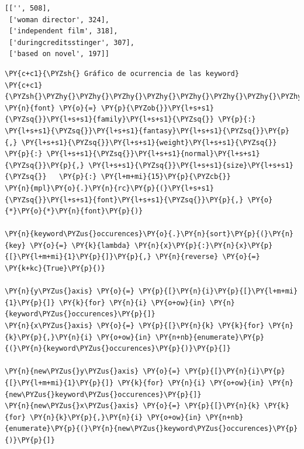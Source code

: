             \begin{tcolorbox}[breakable, boxrule=.5pt, size=fbox, pad at break*=1mm, opacityfill=0]
\begin{Verbatim}[commandchars=\\\{\}]
[['', 508],
 ['woman director', 324],
 ['independent film', 318],
 ['duringcreditsstinger', 307],
 ['based on novel', 197]]
\end{Verbatim}
\end{tcolorbox}
        
    \begin{tcolorbox}[breakable, size=fbox, boxrule=1pt, pad at break*=1mm,colback=cellbackground, colframe=cellborder]
\begin{Verbatim}[commandchars=\\\{\}]
\PY{c+c1}{\PYZsh{} Gráfico de ocurrencia de las keyword}
\PY{c+c1}{\PYZsh{}\PYZhy{}\PYZhy{}\PYZhy{}\PYZhy{}\PYZhy{}\PYZhy{}\PYZhy{}\PYZhy{}\PYZhy{}\PYZhy{}\PYZhy{}\PYZhy{}\PYZhy{}\PYZhy{}\PYZhy{}\PYZhy{}\PYZhy{}\PYZhy{}\PYZhy{}\PYZhy{}\PYZhy{}\PYZhy{}\PYZhy{}\PYZhy{}\PYZhy{}\PYZhy{}\PYZhy{}\PYZhy{}}
\PY{n}{font} \PY{o}{=} \PY{p}{\PYZob{}}\PY{l+s+s1}{\PYZsq{}}\PY{l+s+s1}{family}\PY{l+s+s1}{\PYZsq{}} \PY{p}{:} \PY{l+s+s1}{\PYZsq{}}\PY{l+s+s1}{fantasy}\PY{l+s+s1}{\PYZsq{}}\PY{p}{,} \PY{l+s+s1}{\PYZsq{}}\PY{l+s+s1}{weight}\PY{l+s+s1}{\PYZsq{}} \PY{p}{:} \PY{l+s+s1}{\PYZsq{}}\PY{l+s+s1}{normal}\PY{l+s+s1}{\PYZsq{}}\PY{p}{,} \PY{l+s+s1}{\PYZsq{}}\PY{l+s+s1}{size}\PY{l+s+s1}{\PYZsq{}}   \PY{p}{:} \PY{l+m+mi}{15}\PY{p}{\PYZcb{}}
\PY{n}{mpl}\PY{o}{.}\PY{n}{rc}\PY{p}{(}\PY{l+s+s1}{\PYZsq{}}\PY{l+s+s1}{font}\PY{l+s+s1}{\PYZsq{}}\PY{p}{,} \PY{o}{*}\PY{o}{*}\PY{n}{font}\PY{p}{)}

\PY{n}{keyword\PYZus{}occurences}\PY{o}{.}\PY{n}{sort}\PY{p}{(}\PY{n}{key} \PY{o}{=} \PY{k}{lambda} \PY{n}{x}\PY{p}{:}\PY{n}{x}\PY{p}{[}\PY{l+m+mi}{1}\PY{p}{]}\PY{p}{,} \PY{n}{reverse} \PY{o}{=} \PY{k+kc}{True}\PY{p}{)}

\PY{n}{y\PYZus{}axis} \PY{o}{=} \PY{p}{[}\PY{n}{i}\PY{p}{[}\PY{l+m+mi}{1}\PY{p}{]} \PY{k}{for} \PY{n}{i} \PY{o+ow}{in} \PY{n}{keyword\PYZus{}occurences}\PY{p}{]}
\PY{n}{x\PYZus{}axis} \PY{o}{=} \PY{p}{[}\PY{n}{k} \PY{k}{for} \PY{n}{k}\PY{p}{,}\PY{n}{i} \PY{o+ow}{in} \PY{n+nb}{enumerate}\PY{p}{(}\PY{n}{keyword\PYZus{}occurences}\PY{p}{)}\PY{p}{]}

\PY{n}{new\PYZus{}y\PYZus{}axis} \PY{o}{=} \PY{p}{[}\PY{n}{i}\PY{p}{[}\PY{l+m+mi}{1}\PY{p}{]} \PY{k}{for} \PY{n}{i} \PY{o+ow}{in} \PY{n}{new\PYZus{}keyword\PYZus{}occurences}\PY{p}{]}
\PY{n}{new\PYZus{}x\PYZus{}axis} \PY{o}{=} \PY{p}{[}\PY{n}{k} \PY{k}{for} \PY{n}{k}\PY{p}{,}\PY{n}{i} \PY{o+ow}{in} \PY{n+nb}{enumerate}\PY{p}{(}\PY{n}{new\PYZus{}keyword\PYZus{}occurences}\PY{p}{)}\PY{p}{]}


\end{Verbatim}
\end{tcolorbox}
